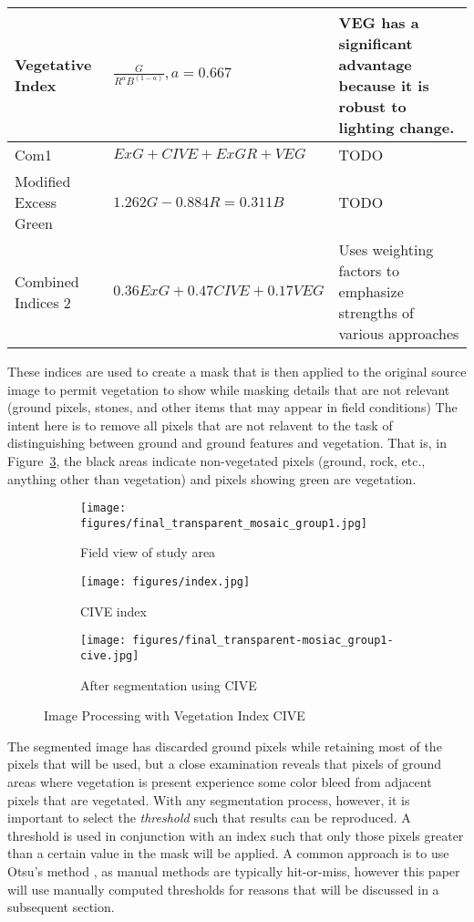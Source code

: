 \documentclass[letterpaper]{article}
\begin{document}
{\begin{table}[H]
\begin{tabular}{  l  p{4cm}  p{5cm} }
Vegetative Index      
& $\frac {G} {R^aB^{(1-a)}}, a = 0.667$ 
& VEG has a significant advantage because it is robust to lighting change.\\\hline
Com1   
& $ExG + CIVE + ExGR + VEG$ 
& TODO \\\hline
Modified Excess Green      
& $1.262G - 0.884R = 0.311B$ 
& TODO \\\hline
Combined Indices 2      
& $0.36ExG + 0.47CIVE + 0.17VEG$ 
& Uses weighting factors to emphasize strengths of various approaches\\\hline    

        \bottomrule
    \end{tabular}
\end{table}
These indices are used to create a mask that is then applied to the original source image to permit vegetation to show while masking details that are not relevant (ground pixels, stones, and other items that may appear in field conditions) The intent here is to remove all pixels that are not relavent to the task of distinguishing between ground and ground features and vegetation.  That is, in Figure~\ref{fig:sub2}, the black areas indicate non-vegetated pixels (ground, rock, etc., anything other than vegetation) and pixels showing green are vegetation.
\begin{figure}[H]
\centering
\begin{subfigure}[]{.30\textwidth}
  \centering
  \texttt{[image: figures/final\_transparent\_mosaic\_group1.jpg]} 
  \caption{Field view of study area}
  \label{fig:sub1}
\end{subfigure}
\begin{subfigure}[]{.30\textwidth}
  \centering
  \texttt{[image: figures/index.jpg]} 
  \caption{CIVE index}
  \label{fig:sub2}
\end{subfigure}
\begin{subfigure}{.30\textwidth}
  \centering
  \texttt{[image: figures/final\_transparent-mosiac\_group1-cive.jpg]}
  \caption{After segmentation using CIVE}
  \label{fig:sub2}
\end{subfigure}
\caption{Image Processing with Vegetation Index CIVE}
\label{fig:segmentation}
\end{figure}
The segmented image has discarded ground pixels while retaining most of the pixels that will be used, but a close examination reveals that pixels of ground areas where vegetation is present experience some color bleed from adjacent pixels that are vegetated. With any segmentation process, however, it is important to select the {\it threshold} such that results can be reproduced. A threshold is used in conjunction with an index such that only those pixels greater than a certain value in the mask will be applied. A common approach is to use Otsu's method \cite{Otsu1979-io} , as manual methods are typically hit-or-miss, however this paper will use manually computed thresholds for reasons that will be discussed in a subsequent section.
}
\end{document}
